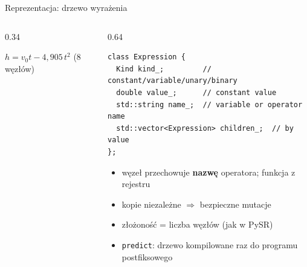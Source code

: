 \documentclass[aspectratio=169,11pt]{beamer}
\begin{document}
\begin{frame}[fragile]{Reprezentacja: drzewo wyrażenia}
  \begin{columns}[c]
    \begin{column}{0.34\textwidth}
      \centering
      \par\medskip
      {\small $h = v_0 t - 4{,}905\,t^2$ \quad(8 węzłów)}
    \end{column}
    \begin{column}{0.64\textwidth}
\begin{lstlisting}
class Expression {
  Kind kind_;         // constant/variable/unary/binary
  double value_;      // constant value
  std::string name_;  // variable or operator name
  std::vector<Expression> children_;  // by value
};
\end{lstlisting}
      \begin{itemize}\small
        \item węzeł przechowuje \textbf{nazwę} operatora; funkcja z rejestru
        \item kopie niezależne $\Rightarrow$ bezpieczne mutacje
        \item złożoność = liczba węzłów (jak w PySR)
        \item \texttt{predict}: drzewo kompilowane raz do programu postfiksowego
      \end{itemize}
    \end{column}
  \end{columns}
\end{frame}
\end{document}
